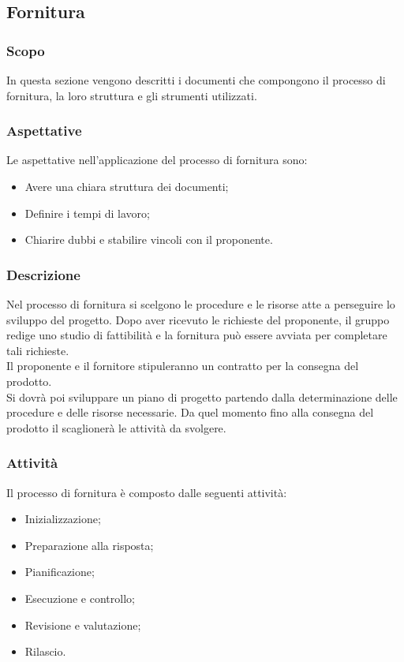 \subsection{Fornitura}
\subsubsection{Scopo}
In questa sezione vengono descritti i documenti che compongono il processo di fornitura, la loro struttura e gli strumenti utilizzati.

\subsubsection{Aspettative}
Le aspettative nell'applicazione del processo di fornitura sono:
\begin{itemize}
	\item Avere una chiara struttura dei documenti;
	\item Definire i tempi di lavoro;
	\item Chiarire dubbi e stabilire vincoli con il proponente.
\end{itemize}

\subsubsection{Descrizione}
Nel processo di fornitura si scelgono le procedure e le risorse atte a perseguire lo sviluppo del progetto. Dopo aver ricevuto le richieste del proponente, il gruppo redige uno studio di fattibilità e la fornitura può essere avviata per completare tali richieste.\\
Il proponente e il fornitore stipuleranno un contratto per la consegna del prodotto.\\
Si dovrà poi sviluppare un piano di progetto partendo dalla determinazione delle procedure e delle risorse necessarie.
Da quel momento fino alla consegna del prodotto il \PdP{} scaglionerà le attività da svolgere.

\subsubsection{Attività}
 Il processo di fornitura è composto dalle seguenti attività:
 \begin{itemize}
 \item Inizializzazione; 
\item Preparazione alla risposta;
\item Pianificazione;
\item Esecuzione e controllo;
\item Revisione e valutazione;
\item Rilascio.
 \end{itemize}

